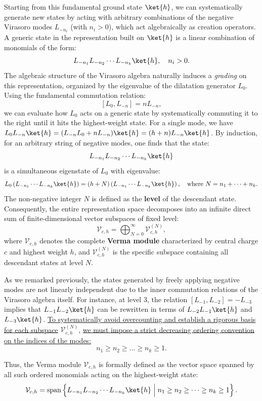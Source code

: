 Starting from this fundamental ground state \(\ket{h}\), we can systematically generate new states by acting with arbitrary combinations of the negative Virasoro modes \(L_{-n_i}\) (with \(n_i > 0\)), which act algebraically as creation operators. A generic state in the representation built on \(\ket{h}\) is a linear combination of monomials of the form:
\[
    L_{-n_1} L_{-n_2} \cdots L_{-n_k} \ket{h}, \quad n_i > 0.
\]
The algebraic structure of the Virasoro algebra naturally induces a \textit{grading} on this representation, organized by the eigenvalue of the dilatation generator \(L_0\). Using the fundamental commutation relation:
\[
    [L_0, L_{-n}] = n L_{-n},
\]
we can evaluate how \(L_0\) acts on a generic state by systematically commuting it to the right until it hits the highest-weight state. For a single mode, we have \(L_0 L_{-n}\ket{h} = (L_{-n}L_0 + nL_{-n})\ket{h} = (h+n)L_{-n}\ket{h}\). By induction, for an arbitrary string of negative modes, one finds that the state:
\[
    L_{-n_1} L_{-n_2} \cdots L_{-n_k} \ket{h}
\]
is a simultaneous eigenstate of \(L_0\) with eigenvalue:
\[
    L_0 \left( L_{-n_1} \cdots L_{-n_k} \ket{h} \right) = (h + N)\left( L_{-n_1} \cdots L_{-n_k} \ket{h} \right), \quad \text{where } N = n_1 + \dots + n_k.
\]
The non-negative integer \(N\) is defined as the \textbf{level} of the descendant state. Consequently, the entire representation space decomposes into an infinite direct sum of finite-dimensional vector subspaces of fixed level:
\[
    \mathcal{V}_{c,h} = \bigoplus_{N=0}^{\infty} \mathcal{V}_{c,h}^{(N)},
\]
where \(\mathcal{V}_{c,h}\) denotes the complete \textbf{Verma module} characterized by central charge \(c\) and highest weight \(h\), and \(\mathcal{V}_{c,h}^{(N)}\) is the specific subspace containing all descendant states at level \(N\).

As we remarked previously, the states generated by freely applying negative modes are not linearly independent due to the inner commutation relations of the Virasoro algebra itself. For instance, at level 3, the relation \([L_{-1}, L_{-2}] = -L_{-3}\) implies that \(L_{-1}L_{-2}\ket{h}\) can be rewritten in terms of \(L_{-2}L_{-1}\ket{h}\) and \(L_{-3}\ket{h}\). \uline{To systematically avoid overcounting and establish a rigorous basis for each subspace} \(\mathcal{V}_{c,h}^{(N)}\), \uline{we must impose a strict decreasing ordering convention on the indices of the modes:}
\[
    n_1 \ge n_2 \ge \dots \ge n_k \ge 1.
\]

Thus, the Verma module \(\mathcal{V}_{c,h}\) is formally defined as the vector space spanned by all such ordered monomials acting on the highest-weight state:
\[
    \mathcal{V}_{c,h} = \mathrm{span} \left\{ L_{-n_1} L_{-n_2} \cdots L_{-n_k} \ket{h} \; \Big| \; n_1 \ge n_2 \ge \dots \ge n_k \ge 1 \right\}.
\]

